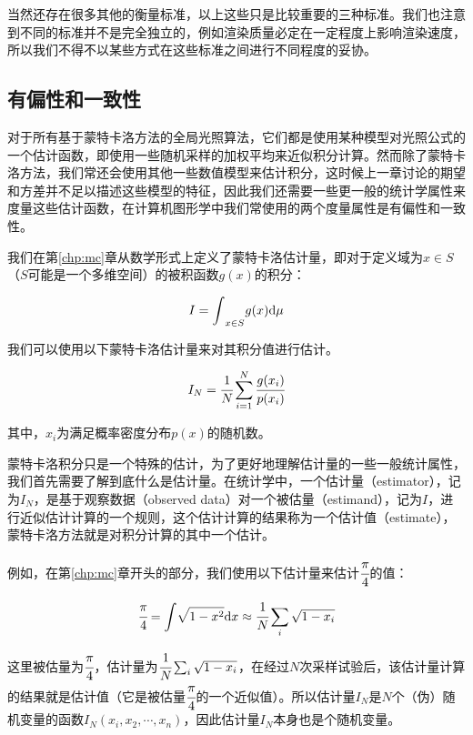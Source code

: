 当然还存在很多其他的衡量标准，以上这些只是比较重要的三种标准。我们也注意到不同的标准并不是完全独立的，例如渲染质量必定在一定程度上影响渲染速度，所以我们不得不以某些方式在这些标准之间进行不同程度的妥协。






\subsection{有偏性和一致性}\label{sec:pt-bias-consistency}
对于所有基于蒙特卡洛方法的全局光照算法，它们都是使用某种模型对光照公式的一个估计函数，即使用一些随机采样的加权平均来近似积分计算。然而除了蒙特卡洛方法，我们常还会使用其他一些数值模型来估计积分，这时候上一章讨论的期望和方差并不足以描述这些模型的特征，因此我们还需要一些更一般的统计学属性来度量这些估计函数，在计算机图形学中我们常使用的两个度量属性是有偏性和一致性。

我们在第\ref{chp:mc}章从数学形式上定义了蒙特卡洛估计量，即对于定义域为$x\in S$（$S$可能是一个多维空间）的被积函数$g(x)$的积分：

\begin{equation}
	I={\rm \int}_{x\in S}g(x){\rm d}\mu
\end{equation}

\noindent 我们可以使用以下蒙特卡洛估计量来对其积分值进行估计。

\begin{equation}
	I_N= \cfrac{1}{N}\sum^{N}_{i=1} \cfrac{g(x_i)}{p(x_i)}
\end{equation}

\noindent 其中，$x_i$为满足概率密度分布$p(x)$的随机数。

蒙特卡洛积分只是一个特殊的估计，为了更好地理解估计量的一些一般统计属性，我们首先需要了解到底什么是估计量。在统计学中，一个估计量（estimator），记为$I_N$，是基于观察数据（observed data）对一个被估量（estimand），记为$I$，进行近似估计计算的一个规则，这个估计计算的结果称为一个估计值（estimate），蒙特卡洛方法就是对积分计算的其中一个估计。

例如，在第\ref{chp:mc}章开头的部分，我们使用以下估计量来估计$ \cfrac{\pi}{4}$的值：

\begin{equation}
	 \cfrac{\pi}{4}={\rm \int}\sqrt{1-x^2}{\rm d}x\approx \cfrac{1}{N}\sum_{i}\sqrt{1-x_i}
\end{equation}

\noindent 这里被估量为$ \cfrac{\pi}{4}$，估计量为$ \cfrac{1}{N}\sum_{i}\sqrt{1-x_i}$，在经过$N$次采样试验后，该估计量计算的结果就是估计值（它是被估量$ \cfrac{\pi}{4}$的一个近似值）。所以估计量$I_N$是$N$个（伪）随机变量的函数$I_N(x_i,x_2,\cdots,x_n)$，因此估计量$I_N$本身也是个随机变量。

